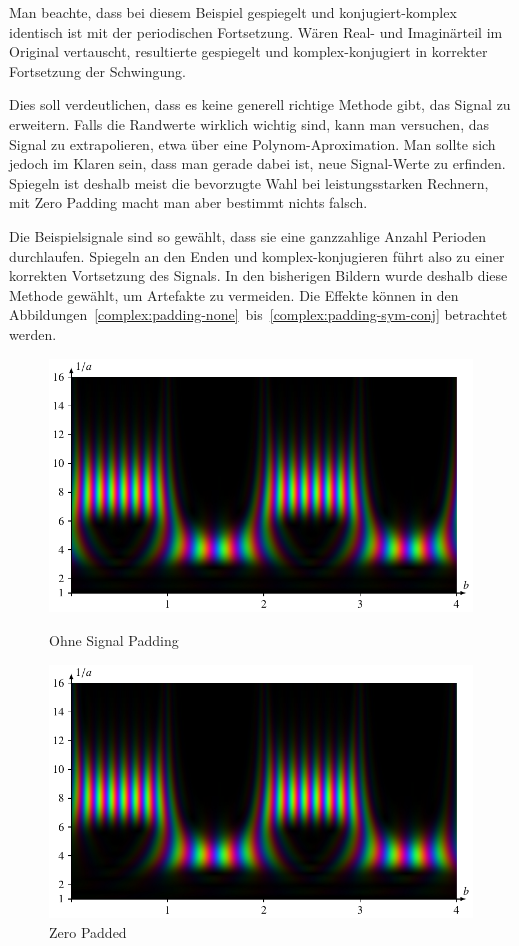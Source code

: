 Man beachte, dass bei diesem Beispiel gespiegelt und konjugiert-komplex identisch ist mit der periodischen Fortsetzung.
Wären Real- und Imaginärteil im Original vertauscht, resultierte gespiegelt und komplex-konjugiert in korrekter Fortsetzung der Schwingung.

Dies soll verdeutlichen, dass es keine generell richtige Methode gibt, das Signal zu erweitern.
Falls die Randwerte wirklich wichtig sind, kann man versuchen, das Signal zu extrapolieren, etwa über eine Polynom-Aproximation.
Man sollte sich jedoch im Klaren sein, dass man gerade dabei ist, neue Signal-Werte zu erfinden.
Spiegeln ist deshalb meist die bevorzugte Wahl bei leistungsstarken Rechnern, mit Zero Padding macht man aber bestimmt nichts falsch.

Die Beispielsignale sind so gewählt, dass sie eine ganzzahlige Anzahl Perioden durchlaufen. 
Spiegeln an den Enden und komplex-konjugieren führt also zu einer korrekten Vortsetzung des Signals.
In den bisherigen Bildern wurde deshalb diese Methode gewählt, um Artefakte zu vermeiden.
Die Effekte können in den Abbildungen~\ref{complex:padding-none}~bis~\ref{complex:padding-sym-conj} betrachtet werden.
\begin{figure}
	\centering
	\includegraphics[width=\linewidth, keepaspectratio]{papers/complex/images/padding_none.pdf}
	\caption{Ohne Signal Padding} \label{complex:padding-none}
	\includegraphics[width=\linewidth, keepaspectratio]{papers/complex/images/padding_zero.pdf}
	\caption{Zero Padded} \label{complex:padding-zero}
\end{figure}
